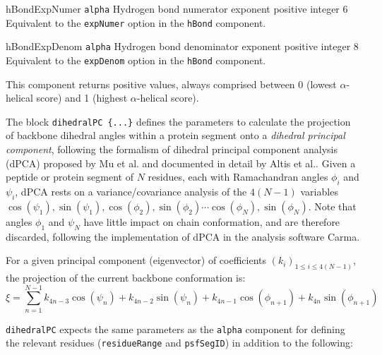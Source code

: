 {\begin{cvcoptions}
\item %
  \keydef
    {hBondExpNumer}{%
    \texttt{alpha}}{%
    Hydrogen bond numerator exponent}{%
    positive integer}{%
    6}{%
    Equivalent to the \texttt{expNumer} option in the \texttt{hBond}
    component.}

\item %
  \keydef
    {hBondExpDenom}{%
    \texttt{alpha}}{%
    Hydrogen bond denominator exponent}{%
    positive integer}{%
    8}{%
    Equivalent to the \texttt{expDenom} option in the \texttt{hBond}
    component.}

\end{cvcoptions}

This component returns positive values, always comprised between 0
(lowest $\alpha$-helical score) and 1 (highest $\alpha$-helical
score).



The block \texttt{dihedralPC~\{...\}} defines the
parameters to calculate the projection of backbone dihedral angles within
a protein segment onto a \emph{dihedral principal component}, following
the formalism of dihedral principal component analysis (dPCA) proposed by
Mu et al.\cite{Mu2005} and documented in detail by Altis et
al.\cite{Altis2007}.
Given a peptide or protein segment of $N$ residues, each with Ramachandran
angles $\phi_i$ and $\psi_i$, dPCA rests on a variance/covariance analysis
of the $4(N-1)$ variables $\cos(\psi_1), \sin(\psi_1), \cos(\phi_2), \sin(\phi_2)
\cdots \cos(\phi_N), \sin(\phi_N)$. Note that angles $\phi_1$ and $\psi_N$
have little impact on chain conformation, and are therefore discarded,
following the implementation of dPCA in the analysis software Carma.\cite{Glykos2006}

For a given principal component (eigenvector) of coefficients
$(k_i)_{1 \leq i \leq 4(N-1)}$,
the projection of the current backbone conformation is:
\begin{equation}
\xi = \sum_{n=1}^{N-1} k_{4n-3} \cos(\psi_n) + k_{4n-2} \sin (\psi_n)
+ k_{4n-1} \cos (\phi_{n+1}) + k_{4n} \sin(\phi_{n+1})
\end{equation}

\texttt{dihedralPC} expects the same parameters as the \texttt{alpha}
component for defining the relevant residues (\texttt{residueRange}
and \texttt{psfSegID}) in addition to the following:

}
